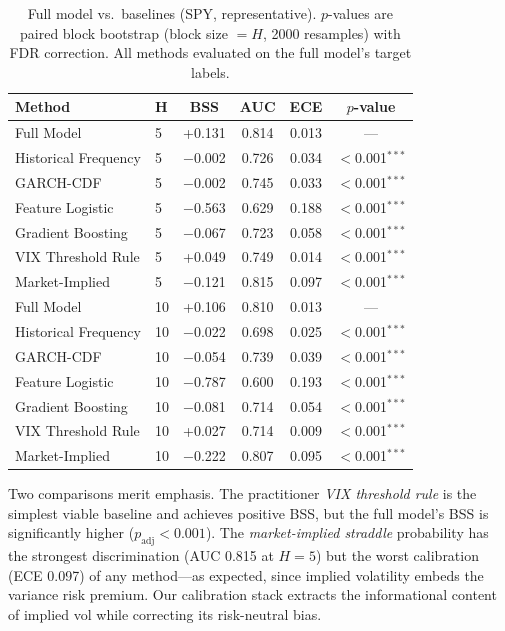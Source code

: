 \documentclass[11pt,a4paper]{article}
\begin{document}
\begin{table}[htbp]
\centering
\small
\caption{Full model vs.\ baselines (SPY, representative). $p$-values are paired block bootstrap (block size $= H$, 2000 resamples) with FDR correction. All methods evaluated on the full model's target labels.}
\label{tab:baselines}
\begin{tabular}{llcccc}
\toprule
Method & H & BSS & AUC & ECE & $p$-value \\
\midrule
Full Model             & 5  & +0.131 & 0.814 & 0.013 & --- \\
Historical Frequency   & 5  & $-$0.002 & 0.726 & 0.034 & $<$0.001$^{***}$ \\
GARCH-CDF              & 5  & $-$0.002 & 0.745 & 0.033 & $<$0.001$^{***}$ \\
Feature Logistic       & 5  & $-$0.563 & 0.629 & 0.188 & $<$0.001$^{***}$ \\
Gradient Boosting      & 5  & $-$0.067 & 0.723 & 0.058 & $<$0.001$^{***}$ \\
VIX Threshold Rule     & 5  & +0.049 & 0.749 & 0.014 & $<$0.001$^{***}$ \\
Market-Implied         & 5  & $-$0.121 & 0.815 & 0.097 & $<$0.001$^{***}$ \\
\midrule
Full Model             & 10 & +0.106 & 0.810 & 0.013 & --- \\
Historical Frequency   & 10 & $-$0.022 & 0.698 & 0.025 & $<$0.001$^{***}$ \\
GARCH-CDF              & 10 & $-$0.054 & 0.739 & 0.039 & $<$0.001$^{***}$ \\
Feature Logistic       & 10 & $-$0.787 & 0.600 & 0.193 & $<$0.001$^{***}$ \\
Gradient Boosting      & 10 & $-$0.081 & 0.714 & 0.054 & $<$0.001$^{***}$ \\
VIX Threshold Rule     & 10 & +0.027 & 0.714 & 0.009 & $<$0.001$^{***}$ \\
Market-Implied         & 10 & $-$0.222 & 0.807 & 0.095 & $<$0.001$^{***}$ \\
\bottomrule
\end{tabular}
\end{table}

Two comparisons merit emphasis. The practitioner \emph{VIX threshold rule} is the simplest viable baseline and achieves positive BSS, but the full model's BSS is significantly higher ($p_{\text{adj}} < 0.001$). The \emph{market-implied straddle} probability has the strongest discrimination (AUC 0.815 at $H\!=\!5$) but the worst calibration (ECE 0.097) of any method---as expected, since implied volatility embeds the variance risk premium. Our calibration stack extracts the informational content of implied vol while correcting its risk-neutral bias.
\end{document}
